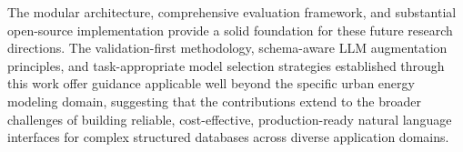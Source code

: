 The modular architecture, comprehensive evaluation framework, and substantial open-source implementation provide a solid foundation for these future research directions. The validation-first methodology, schema-aware LLM augmentation principles, and task-appropriate model selection strategies established through this work offer guidance applicable well beyond the specific urban energy modeling domain, suggesting that the contributions extend to the broader challenges of building reliable, cost-effective, production-ready natural language interfaces for complex structured databases across diverse application domains.

